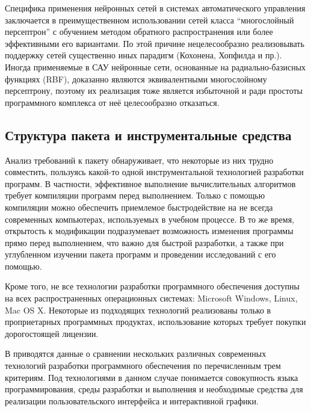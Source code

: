 Специфика применения нейронных сетей в системах автоматического
управления заключается в преимущественном использовании сетей класса
``многослойный персептрон'' с обучением методом обратного
распространения или более эффективными его вариантами.  По этой
причине нецелесообразно реализовывать поддержку сетей существенно иных
парадигм (Кохонена, Хопфилда и пр.).  Иногда применяемые в САУ
нейронные сети, основанные на радиально-базисных функциях (RBF),
доказанно являются эквивалентными многослойному персептрону, поэтому
их реализация тоже является избыточной и ради простоты программного
комплекса от неё целесообразно отказаться.

\subsection{Структура пакета и инструментальные средства}

Анализ требований к пакету обнаруживает, что некоторые из них трудно
совместить, пользуясь какой-то одной инструментальной технологией
разработки программ.  В частности, эффективное выполнение
вычислительных алгоритмов требует компиляции программ перед
выполнением.  Только с помощью компиляции можно обеспечить приемлемое
быстродействие на не всегда современных компьютерах, используемых в
учебном процессе.  В то же время, открытость к модификации
подразумевает возможность изменения программы прямо перед выполнением,
что важно для быстрой разработки, а также при углубленном изучении
пакета программ и проведении исследований с его помощью.

Кроме того, не все технологии разработки программного обеспечения
доступны на всех распространенных операционных системах: Microsoft
Windows, Linux, Mac OS X.  Некоторые из подходящих технологий
реализованы только в проприетарных программных продуктах,
использование которых требует покупки дорогостоящей лицензии.

В  приводятся данные о сравнении нескольких
различных современных технологий разработки программного обеспечения
по перечисленным трем критериям.  Под технологиями в данном случае
понимается совокупность языка программирования, среды разработки и
выполнения и необходимые средства для реализации пользовательского
интерфейса и интерактивной графики.

